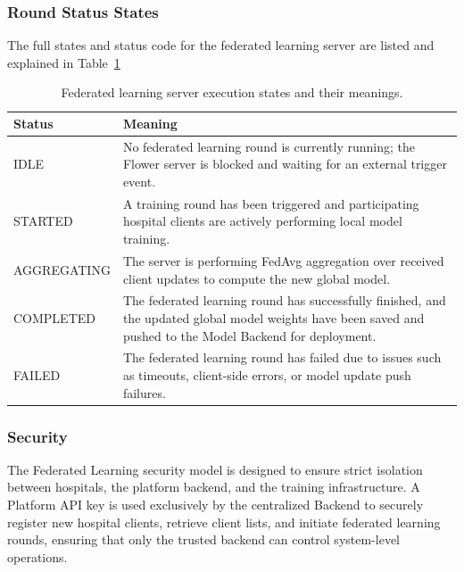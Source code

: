 \subsubsection{Round Status States}
The full states and status code for the federated learning server are listed and explained in Table~\ref{tab:fl_status}
\begin{table}[htbp]
	\centering
	\caption{Federated learning server execution states and their meanings.}
	\label{tab:fl_status}
	\begin{tabular}{|p{3.5cm}|p{10cm}|}
		\hline
		\textbf{Status} & \textbf{Meaning} \\
		\hline
		
		IDLE &
		No federated learning round is currently running; the Flower server is blocked and waiting for an external trigger event. \\
		\hline
		
		STARTED &
		A training round has been triggered and participating hospital clients are actively performing local model training. \\
		\hline
		
		AGGREGATING &
		The server is performing FedAvg aggregation over received client updates to compute the new global model. \\
		\hline
		
		COMPLETED &
		The federated learning round has successfully finished, and the updated global model weights have been saved and pushed to the Model Backend for deployment. \\
		\hline
		
		FAILED &
		The federated learning round has failed due to issues such as timeouts, client-side errors, or model update push failures. \\
		\hline
		
	\end{tabular}
\end{table}

\subsubsection{Security}
The Federated Learning security model is designed to ensure strict isolation between hospitals, the platform backend, and the training infrastructure. A Platform API key is used exclusively by the centralized Backend to securely register new hospital clients, retrieve client lists, and initiate federated learning rounds, ensuring that only the trusted backend can control system-level operations.

